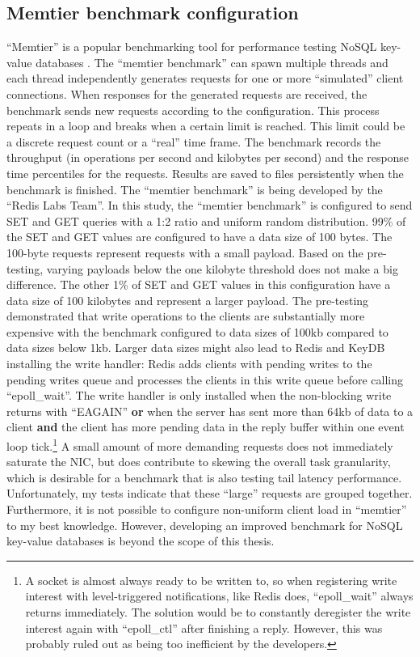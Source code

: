 \subsection{Memtier benchmark configuration}
“Memtier” is a popular benchmarking tool for performance testing NoSQL key-value databases \cite{soft:memtier}. The “memtier benchmark” can spawn multiple threads and each thread independently generates requests for one or more “simulated” client connections. When responses for the generated requests are received, the benchmark sends new requests according to the configuration. This process repeats in a loop and breaks when a certain limit is reached. This limit could be a discrete request count or a “real” time frame. The benchmark records the throughput (in operations per second and kilobytes per second) and the response time percentiles for the requests. Results are saved to files persistently when the benchmark is finished. The “memtier benchmark” is being developed by the “Redis Labs Team”. \newline
In this study, the “memtier benchmark” is configured to send SET and GET queries with a 1:2 ratio and uniform random distribution. 99\% of the SET and GET values are configured to have a data size of 100 bytes. The 100-byte requests represent requests with a small payload. Based on the pre-testing, varying payloads below the one kilobyte threshold does not make a big difference. The other 1\% of SET and GET values in this configuration have a data size of 100 kilobytes and represent a larger payload. \newline
The pre-testing demonstrated that write operations to the clients are substantially more expensive with the benchmark configured to data sizes of 100kb compared to data sizes below 1kb. Larger data sizes might also lead to Redis and KeyDB installing the write handler: \newline
Redis adds clients with pending writes to the pending writes queue and processes the clients in this write queue before calling “epoll\_wait”. The write handler is only installed when the non-blocking write returns with “EAGAIN” \textbf{or} when the server has sent more than 64kb of data to a client \textbf{and} the client has more pending data in the reply buffer within one event loop tick.\footnote{A socket is almost always ready to be written to, so when registering write interest with level-triggered notifications, like Redis does, “epoll\_wait” always returns immediately. The solution would be to constantly deregister the write interest again with “epoll\_ctl” after finishing a reply. However, this was probably ruled out as being too inefficient by the developers.} \newline A small amount of more demanding requests does not immediately saturate the NIC, but does contribute to skewing the overall task granularity, which is desirable for a benchmark that is also testing tail latency performance. Unfortunately, my tests indicate that these “large” requests are grouped together.  \newline Furthermore, it is not possible to configure non-uniform client load in “memtier” to my best knowledge. However, developing an improved benchmark for NoSQL key-value databases is beyond the scope of this thesis. \newline
